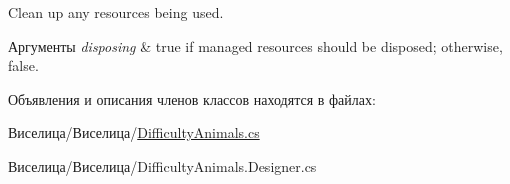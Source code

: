 Clean up any resources being used. 


\begin{DoxyParams}{Аргументы}
{\em disposing} & true if managed resources should be disposed; otherwise, false.\\
\hline
\end{DoxyParams}


Объявления и описания членов классов находятся в файлах\+:\begin{DoxyCompactItemize}
\item 
Виселица/Виселица/\hyperlink{_difficulty_animals_8cs}{Difficulty\+Animals.\+cs}\item 
Виселица/Виселица/Difficulty\+Animals.\+Designer.\+cs\end{DoxyCompactItemize}
